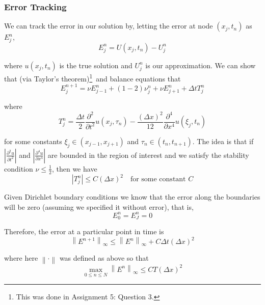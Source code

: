 \documentclass[12pt]{article}
\newcommand\norm[1]{\left\lVert#1\right\rVert} %
\newlength\tindent
\renewcommand{\indent}{\hspace*{\tindent}}
\begin{document}
\subsubsection{Error Tracking}

We can track the error in our solution by, letting the error at node $(x_j, t_n)$ as $E^n_j$,
\begin{equation*}
	E^n_j = U(x_j, t_n) - U^n_j
\end{equation*}

where $u(x_j, t_n)$ is the true solution and $U^n_j$ is our approximation. We can show that (via Taylor's theorem)\footnote{This was done in Assignment 5: Question 3.}~and balance equations that
\begin{equation*}
	E^{n + 1}_j = \nu E^n_{j - 1} + (1 - 2)\nu^n_j + \nu E^n_{j + 1} + \Delta t T^n_j
\end{equation*}

where
\begin{equation*}
	T^n_j = \frac{\Delta t}{2} \frac{\partial^2}{\partial t^2} u(x_j, \tau_n) -  \frac{(\Delta x)^2}{12} \frac{\partial^4}{\partial x^4} u(\xi_j, t_n)
\end{equation*}

for some constants $\xi_j \in (x_{j - 1}, x_{j + 1})$ and $\tau_n \in (t_n, t_{n + 1})$. The idea is that if $\left| \frac{\partial^2 u}{\partial t^2} \right|$ and $\left| \frac{\partial^4 u}{\partial x^4}\right|$ are bounded in the region of interest and we satisfy the stability condition $\nu \leq \frac{1}{2}$, then we have
\begin{equation*}
 \left| T^n_j \right| \leq C(\Delta x)^2 \quad \text{for some constant } C
\end{equation*}

\indent Given Dirichlet boundary conditions we know that the error along the boundaries will be zero (assuming we specified it without error), that is,
\begin{equation*}
	E^n_0 = E^n_J = 0
\end{equation*}

Therefore, the error at a particular point in time is
\begin{equation*}
	\norm{E^{n + 1}}_\infty \leq \norm{E^n}_\infty + C\Delta t(\Delta x)^2
\end{equation*}

where here $\norm{\cdot}$ was defined as above so that
\begin{equation*}
	\max_{0 \leq n \leq N} \norm{E^n}_\infty \leq CT(\Delta x)^2
\end{equation*}
\end{document}
